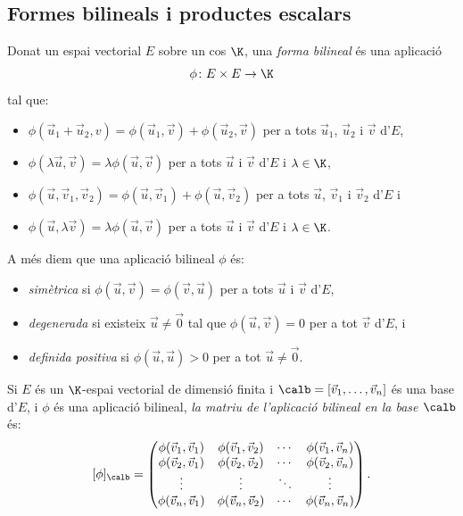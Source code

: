 \subsection{Formes bilineals i productes escalars}
\begin{definicio}
Donat un espai vectorial $E$ sobre un cos $\K$, una \emph{forma bilineal} és una aplicació
\[
\phi \colon E \times E \to \K
\]
tal que:
\begin{itemize}
\item $\phi(\vec u_1+\vec u_2,v)=\phi(\vec u_1,\vec v)+\phi(\vec u_2,\vec v)$ per a tots $\vec u_1$, $\vec u_2$ i $\vec v$ d'$E$,
\item $\phi(\lambda \vec u,\vec v)=\lambda \phi(\vec u,\vec v)$ per a tots $\vec u$ i $\vec v$ d'$E$ i $\lambda \in \K$,
\item $\phi(\vec u,\vec v_1,\vec v_2)=\phi(\vec u,\vec v_1)+\phi(\vec u,\vec v_2)$ per a tots $\vec u$, $\vec v_1$ i $\vec v_2$ d'$E$ i
\item $\phi(\vec u,\lambda \vec v)=\lambda \phi(\vec u,\vec v)$ per a tots $\vec u$ i $\vec v$ d'$E$ i $\lambda \in \K$.
\end{itemize}
A més diem que una aplicació bilineal $\phi$ és:
\begin{itemize}
    \item \emph{simètrica} si $\phi(\vec u,\vec v)=\phi(\vec v,\vec u)$ per a tots $\vec u$ i $\vec v$ d'$E$,
    \item \emph{degenerada} si existeix $\vec u\neq \vec 0$ tal que $\phi(\vec u,\vec v)=0$ per a tot $\vec v$ d'$E$, i
    \item \emph{definida positiva} si $\phi(\vec u,\vec u)>0$ per a tot $\vec u\neq \vec 0$.
\end{itemize}
\end{definicio}
\begin{definicio}\label{def:mat_apl_bil}
Si $E$ és un $\K$-espai vectorial de dimensió finita i $\calb=[\vec v_1, \dots, \vec v_n]$ és una base d'$E$, i $\phi$ és una aplicació bilineal, \emph{la matriu de l'aplicació bilineal en la base $\calb$} és:
\[
[\phi]_\calb= \begin{pmatrix}
\phi(\vec v_1,\vec v_1) & \phi(\vec v_1,\vec v_2) & \cdots & \phi(\vec v_1,\vec v_n)\\
\phi(\vec v_2,\vec v_1) & \phi(\vec v_2,\vec v_2) & \cdots & \phi(\vec v_2,\vec v_n)\\
\vdots & \vdots & \ddots & \vdots \\
\phi(\vec v_n,\vec v_1) & \phi(\vec v_n,\vec v_2) & \cdots & \phi(\vec v_n,\vec v_n)
\end{pmatrix}.
\]
\end{definicio}
